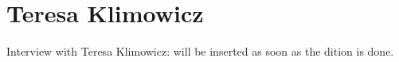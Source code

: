 \section{Teresa Klimowicz}

Interview with Teresa Klimowicz: will be inserted as soon as the dition is done.